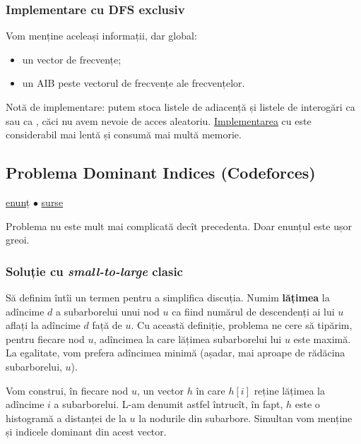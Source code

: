 \documentclass[../main.tex]{subfiles}
\begin{document}
\subsubsection*{Implementare cu DFS exclusiv}

Vom menține aceleași informații, dar global:

\begin{itemize}
  \item un vector de frecvențe;
  \item un AIB peste vectorul de frecvențe ale frecvențelor.
\end{itemize}

Notă de implementare: putem stoca listele de adiacență și listele de interogări ca  sau ca , căci nu avem nevoie de acces aleatoriu. \href{https://codeforces.com/contest/375/submission/294270594}{Implementarea} cu  este considerabil mai lentă și consumă mai multă memorie.


\subsection{Problema Dominant Indices (Codeforces)}
\label{problem:dominant-indices}

\href{https://codeforces.com/contest/1009/problem/F}{enunț}
$\bullet$
\hyperref[code:dominant-indices]{surse}

Problema nu este mult mai complicată decît precedenta. Doar enunțul este ușor greoi.

\subsubsection*{Soluție cu \textit{small-to-large} clasic}

Să definim întîi un termen pentru a simplifica discuția. Numim \textbf{lățimea} la adîncime $d$ a subarborelui unui nod $u$ ca fiind numărul de descendenți ai lui $u$ aflați la adîncime $d$ față de $u$. Cu această definiție, problema ne cere să tipărim, pentru fiecare nod $u$, adîncimea la care lățimea subarborelui lui $u$ este maximă. La egalitate, vom prefera adîncimea minimă (așadar, mai aproape de rădăcina subarborelui, $u$).

Vom construi, în fiecare nod $u$, un vector $h$ în care $h[i]$ reține lățimea la adîncime $i$ a subarborelui. L-am denumit astfel întrucît, în fapt, $h$ este o histogramă a distanței de la $u$ la nodurile din subarbore. Simultan vom menține și indicele dominant din acest vector.
\end{document}
